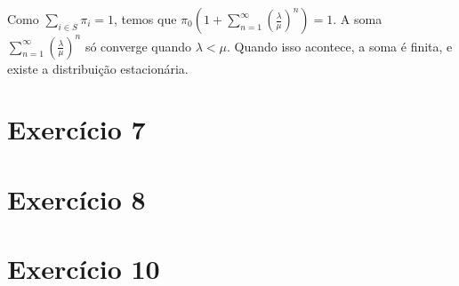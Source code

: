\documentclass[12pt]{article}
\begin{document}
	Como $ \sum_{i \in S} \pi_i = 1 $, temos que $ \pi_0 \left(1 + \sum_{n=1}^{\infty} \left(\frac{\lambda}{\mu}\right)^n\right) = 1 $. A soma $ \sum_{n=1}^{\infty} \left(\frac{\lambda}{\mu}\right)^n $ só converge quando $ \lambda < \mu $. Quando isso acontece, a soma é finita, e existe a distribuição estacionária.
	
	\section*{Exercício 7}
	\section*{Exercício 8}
	\section*{Exercício 10}
	 
\end{document}
